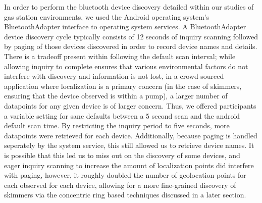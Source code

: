 In order to perform the bluetooth device discovery detailed within our studies of gas station
environments, we used the Android operating system's BluetoothAdapter interface to operating
system services. A BluetoothAdapter device discovery cycle typically consists of 12 seconds
of inquiry scanning followed by paging of those devices discovered in order to record device
names and details. There is a tradeoff present within following the default scan interval;
while allowing inquiry to complete ensures that various environmental factors
do not interfere with discovery and information is not lost, in a crowd-sourced application
where localization is a primary concern (in the case of skimmers, ensuring that the device
observed is within a pump), a larger number of datapoints for any given device is of larger
concern. Thus, we offered participants a variable setting for sane defaults between a 5
second scan and the android default scan time. By restricting the inquiry period to five
seconds, more datapoints were retrieved for each device. Additionally, because paging is handled
seperately by the system service, this still allowed us to retrieve device names. It is possible
that this led us to miss out on the discovery of some devices, and eager inquiry scanning to
increase the amount of localization points did interfere with paging, however, it roughly
doubled the number of geolocation points for each observed for each device, allowing for a
more fine-grained discovery of skimmers via the concentric ring based techniques discussed
in a later section.

